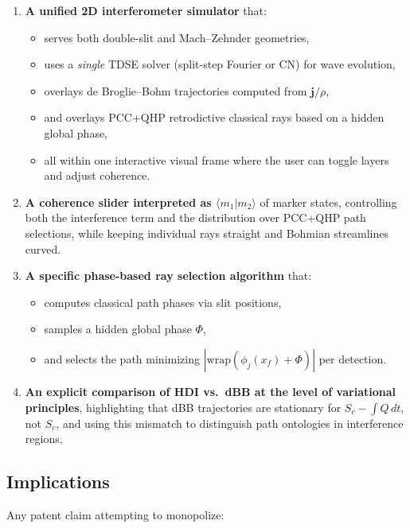 \documentclass[11pt]{article}
\begin{document}
\begin{enumerate}[leftmargin=*]
  \item \textbf{A unified 2D interferometer simulator} that:
  \begin{itemize}
    \item serves both double-slit and Mach--Zehnder geometries,
    \item uses a \emph{single} TDSE solver (split-step Fourier or CN) for wave evolution,
    \item overlays de Broglie--Bohm trajectories computed from \(\mathbf j/\rho\),
    \item and overlays PCC+QHP retrodictive classical rays based on a hidden global phase,
    \item all within one interactive visual frame where the user can toggle layers and adjust coherence.
  \end{itemize}

  \item \textbf{A coherence slider interpreted as \(\langle m_1|m_2\rangle\)} of marker states, controlling both the interference term and the distribution over PCC+QHP path selections, while keeping individual rays straight and Bohmian streamlines curved.

  \item \textbf{A specific phase-based ray selection algorithm} that:
  \begin{itemize}
    \item computes classical path phases via slit positions,
    \item samples a hidden global phase \(\Phi\),
    \item and selects the path minimizing \(|\mathrm{wrap}(\phi_j(x_f)+\Phi)|\) per detection.
  \end{itemize}

  \item \textbf{An explicit comparison of HDI vs.\ dBB at the level of variational principles}, highlighting that dBB trajectories are stationary for \(S_c - \int Q\,dt\), not \(S_c\), and using this mismatch to distinguish path ontologies in interference regions.
\end{enumerate}

\subsection{Implications}

Any patent claim attempting to monopolize:
\end{document}
